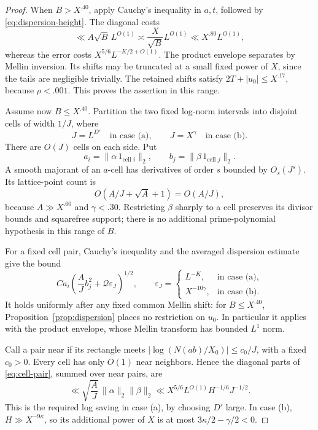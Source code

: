 \begin{proof}
When \(B>X^{.40}\), apply Cauchy's inequality in \(a,t\), followed by
\eqref{eq:dispersion-height}. The diagonal costs
\[
 \ll A\sqrt B\,L^{O(1)}
 \asymp \frac X{\sqrt B}L^{O(1)}
 \ll X^{.80}L^{O(1)},
\]
whereas the error costs \(X^{5/6}L^{-K/2+O(1)}\).
The product envelope separates by Mellin inversion. Its shifts may
be truncated at a small fixed power of \(X\), since the tails are
negligible trivially. The retained shifts satisfy
\(2T+|u_0|\le X^{.17}\), because \(\rho<.001\).
This proves the assertion in this range.

Assume now \(B\le X^{.40}\). Partition the two fixed log-norm
intervals into disjoint cells of width \(1/J\), where
\[
 J=L^{D'}\quad\text{in case (a)},\qquad
 J=X^\gamma\quad\text{in case (b)}.
\]
There are \(O(J)\) cells on each side. Put
\[
 a_i=\|\alpha\,1_{\text{cell }i}\|_2,
 \qquad b_j=\|\beta\,1_{\text{cell }j}\|_2.
\]
A smooth majorant of an \(a\)-cell has derivatives of order \(s\)
bounded by \(O_s(J^s)\). Its lattice-point count is
\[
 O(A/J+\sqrt A+1)=O(A/J),
\]
because \(A\gg X^{.60}\) and \(\gamma<.30\).
Restricting \(\beta\) sharply to a cell preserves its divisor bounds
and squarefree support; there is no additional prime-polynomial
hypothesis in this range of \(B\).

For a fixed cell pair, Cauchy's inequality and the averaged dispersion
estimate give the bound
\begin{equation}
 C a_i\left(\frac A J b_j^2+\mathcal Q\varepsilon_J\right)^{1/2},
 \qquad
 \varepsilon_J=
 \begin{cases}
 L^{-K},&\text{in case (a)},\\
 X^{-10\gamma},&\text{in case (b)}.
 \end{cases}
 \label{eq:cell-pair}
\end{equation}
It holds uniformly after any fixed common Mellin shift: for
\(B\le X^{.40}\), Proposition~\ref{prop:dispersion} places no
restriction on \(u_0\). In particular it applies with the product
envelope, whose Mellin transform has bounded \(L^1\) norm.

Call a pair near if its rectangle meets
\(\left|\log(N(ab)/X_0)\right|\le c_0/J\), with a fixed
\(c_0>0\). Every cell has only \(O(1)\) near neighbors. Hence the
diagonal parts of \eqref{eq:cell-pair}, summed over near pairs, are
\begin{equation}
 \ll\sqrt{\frac A J}\,\|\alpha\|_2\|\beta\|_2
 \ll X^{5/6}L^{O(1)}H^{-1/6}J^{-1/2}.
 \label{eq:near-cell-diagonal}
\end{equation}
This is the required log saving in case (a), by choosing \(D'\)
large. In case (b), \(H\gg X^{-9\kappa}\), so its additional
power of \(X\) is at most
\(3\kappa/2-\gamma/2<0\).


\end{proof}
